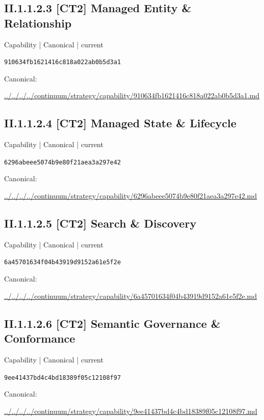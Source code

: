 \documentclass[10pt,a4paper]{article}
\begin{document}
\subsection*{II.1.1.2.3 [CT2] Managed Entity \& Relationship}
\label{element-910634fb1621416c818a022ab0b5d3a1}
{\small Capability | Canonical | current}\par
\texttt{910634fb1621416c818a022ab0b5d3a1}\par
Canonical: \par
{\footnotesize\url{../../../../continuum/strategy/capability/910634fb1621416c818a022ab0b5d3a1.md}}\par
\subsection*{II.1.1.2.4 [CT2] Managed State \& Lifecycle}
\label{element-6296abeee5074b9e80f21aea3a297e42}
{\small Capability | Canonical | current}\par
\texttt{6296abeee5074b9e80f21aea3a297e42}\par
Canonical: \par
{\footnotesize\url{../../../../continuum/strategy/capability/6296abeee5074b9e80f21aea3a297e42.md}}\par
\subsection*{II.1.1.2.5 [CT2] Search \& Discovery}
\label{element-6a45701634f04b43919d9152a61e5f2e}
{\small Capability | Canonical | current}\par
\texttt{6a45701634f04b43919d9152a61e5f2e}\par
Canonical: \par
{\footnotesize\url{../../../../continuum/strategy/capability/6a45701634f04b43919d9152a61e5f2e.md}}\par
\subsection*{II.1.1.2.6 [CT2] Semantic Governance \& Conformance}
\label{element-9ee41437bd4c4bd18389f05c12108f97}
{\small Capability | Canonical | current}\par
\texttt{9ee41437bd4c4bd18389f05c12108f97}\par
Canonical: \par
{\footnotesize\url{../../../../continuum/strategy/capability/9ee41437bd4c4bd18389f05c12108f97.md}}\par
\end{document}
